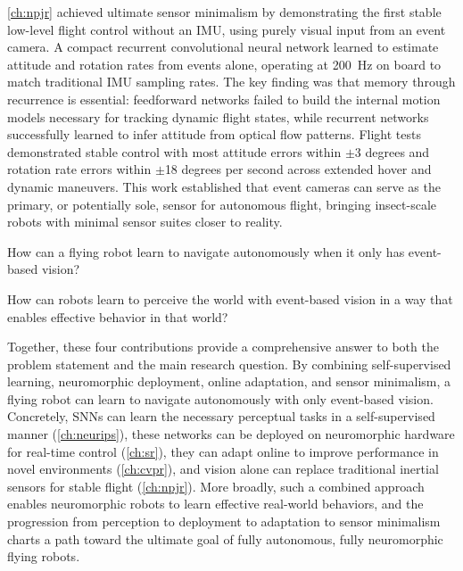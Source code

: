 \cref{ch:npjr} achieved ultimate sensor minimalism by demonstrating the first stable low-level flight control without an IMU, using purely visual input from an event camera. A compact recurrent convolutional neural network learned to estimate attitude and rotation rates from events alone, operating at 200~Hz on board to match traditional IMU sampling rates. The key finding was that memory through recurrence is essential: feedforward networks failed to build the internal motion models necessary for tracking dynamic flight states, while recurrent networks successfully learned to infer attitude from optical flow patterns. Flight tests demonstrated stable control with most attitude errors within $\pm$3 degrees and rotation rate errors within $\pm$18 degrees per second across extended hover and dynamic maneuvers. This work established that event cameras can serve as the primary, or potentially sole, sensor for autonomous flight, bringing insect-scale robots with minimal sensor suites closer to reality.

\begin{tcolorbox}[title={\textbf{Problem Statement}}]
    How can a flying robot learn to navigate autonomously when it only has event-based vision?
\end{tcolorbox}

\begin{tcolorbox}[title={\textbf{Main Research Question}}]
    How can robots learn to perceive the world with event-based vision in a way that enables effective behavior in that world?
\end{tcolorbox}

Together, these four contributions provide a comprehensive answer to both the problem statement and the main research question. By combining self-supervised learning, neuromorphic deployment, online adaptation, and sensor minimalism, a flying robot can learn to navigate autonomously with only event-based vision. Concretely, SNNs can learn the necessary perceptual tasks in a self-supervised manner (\cref{ch:neurips}), these networks can be deployed on neuromorphic hardware for real-time control (\cref{ch:sr}), they can adapt online to improve performance in novel environments (\cref{ch:cvpr}), and vision alone can replace traditional inertial sensors for stable flight (\cref{ch:npjr}). More broadly, such a combined approach enables neuromorphic robots to learn effective real-world behaviors, and the progression from perception to deployment to adaptation to sensor minimalism charts a path toward the ultimate goal of fully autonomous, fully neuromorphic flying robots.

